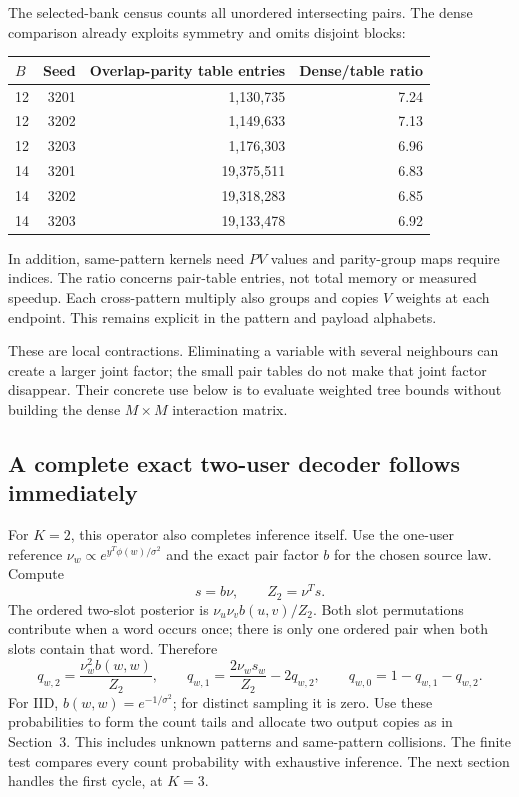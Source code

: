 \documentclass[10pt,a4paper]{article}
\begin{document}
The selected-bank census counts all unordered intersecting pairs. The dense comparison already exploits
symmetry and omits disjoint blocks:
\begin{center}
\begin{tabular}{@{}lrrr@{}}\toprule
$B$ & Seed & Overlap-parity table entries & Dense/table ratio\\\midrule
12 & 3201 & 1,130,735 & 7.24\\
12 & 3202 & 1,149,633 & 7.13\\
12 & 3203 & 1,176,303 & 6.96\\
14 & 3201 & 19,375,511 & 6.83\\
14 & 3202 & 19,318,283 & 6.85\\
14 & 3203 & 19,133,478 & 6.92\\\bottomrule
\end{tabular}
\end{center}
In addition, same-pattern kernels need $PV$ values and parity-group maps require indices.
The ratio concerns pair-table entries, not total memory or measured speedup. Each cross-pattern multiply
also groups and copies $V$ weights at each endpoint. This remains explicit in the pattern and payload alphabets.

These are local contractions. Eliminating a variable with several neighbours can create a larger joint factor;
the small pair tables do not make that joint factor disappear. Their concrete use below is to evaluate weighted
tree bounds without building the dense $M\times M$ interaction matrix.

\subsection{A complete exact two-user decoder follows immediately}
For $K=2$, this operator also completes inference itself. Use the one-user reference
$\nu_w\propto e^{y^T\phi(w)/\sigma^2}$ and the exact pair factor $b$ for the chosen source law.
Compute
\[
 s=b\nu,\qquad Z_2=\nu^Ts.
\]
The ordered two-slot posterior is $\nu_u\nu_vb(u,v)/Z_2$.
Both slot permutations contribute when a word occurs once; there is only one ordered pair when both slots
contain that word. Therefore
\begin{equation}
 q_{w,2}=\frac{\nu_w^2b(w,w)}{Z_2},\qquad
 q_{w,1}=\frac{2\nu_ws_w}{Z_2}-2q_{w,2},\qquad
 q_{w,0}=1-q_{w,1}-q_{w,2}.
 \label{eq:structured-two-user}
\end{equation}
For IID, $b(w,w)=e^{-1/\sigma^2}$; for distinct sampling it is zero.
Use these probabilities to form the count tails and allocate two output copies as in Section~3.
This includes unknown patterns and same-pattern collisions. The finite test compares every count probability
with exhaustive inference. The next section handles the first cycle, at $K=3$.
\end{document}
